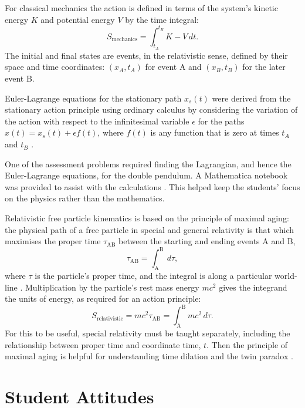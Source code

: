 \documentclass[prb,oncolumn,12pt]{revtex4-2}
\begin{document}
For classical mechanics the action is defined in terms of the system's kinetic energy $K$ and potential energy $V$ by the time integral:
%
\begin{equation} \label{action}
S_\textrm{mechanics} = \int_{t_A}^{t_B} K-V \, dt .
\end{equation}
%
The initial and final states are events, in the relativistic sense, defined by their space and time coordinates: $(x_A,t_A)$ for event A and $(x_B,t_B)$ for the later event B.

Euler-Lagrange equations for the stationary path $x_s(t)$ were derived from the stationary action principle using ordinary calculus by considering the variation of the action with respect to the infinitesimal variable $\epsilon$ for the paths $x(t) = x_s(t)+\epsilon f(t)$, where $f(t)$ is any function that is zero at times $t_A$ and $t_B$ \cite{HancAJP2004b}.  

One of the assessment problems required finding the Lagrangian, and hence the Euler-Lagrange equations, for the double pendulum. A Mathematica notebook was provided to assist with the calculations \cite{Mathematica, supplement}.  This helped keep the students' focus on the physics rather than the mathematics.

Relativistic free particle kinematics is based on the principle of maximal aging: \cite{TaylorandWheeler} the physical path of a free particle in special and general relativity is that which maximises the proper time $\tau_\textrm{AB}$ between the starting and ending events A and B,
%
\begin{equation} \label{maximal aging}
\tau_\textrm{AB} = \int_\textrm{A}^\textrm{B}  \, d\tau ,
\end{equation}
%
where $\tau$ is the particle's proper time, and the integral is along a particular world-line \cite{GR}.  Multiplication by the particle's rest mass energy $m c^2$ gives the integrand the units of energy, as required for an action principle:
%
\begin{equation} \label{maximal aging rest mass}
S_\textrm{relativistic} = m c^2 \tau_\textrm{AB} = \int_\textrm{A}^\textrm{B} m c^2  \, d\tau .
\end{equation}
%
For this to be useful, special relativity must be taught separately, including the relationship between proper time and coordinate time, $t$. Then the principle of maximal aging is helpful for understanding time dilation and the twin paradox \cite{Taylor2003,TaylorandWheeler}. 

\section{Student Attitudes}
\label{Student Attitudes}
\end{document}
